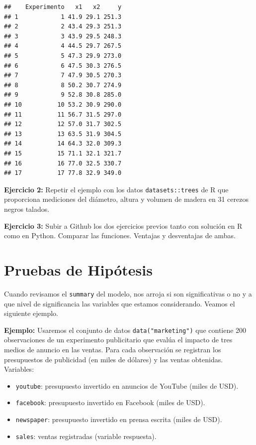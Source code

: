 \documentclass[
]{book}
\providecommand{\tightlist}{%
  \setlength{\itemsep}{0pt}\setlength{\parskip}{0pt}}
\begin{document}
\begin{verbatim}
##    Experimento   x1   x2     y
## 1            1 41.9 29.1 251.3
## 2            2 43.4 29.3 251.3
## 3            3 43.9 29.5 248.3
## 4            4 44.5 29.7 267.5
## 5            5 47.3 29.9 273.0
## 6            6 47.5 30.3 276.5
## 7            7 47.9 30.5 270.3
## 8            8 50.2 30.7 274.9
## 9            9 52.8 30.8 285.0
## 10          10 53.2 30.9 290.0
## 11          11 56.7 31.5 297.0
## 12          12 57.0 31.7 302.5
## 13          13 63.5 31.9 304.5
## 14          14 64.3 32.0 309.3
## 15          15 71.1 32.1 321.7
## 16          16 77.0 32.5 330.7
## 17          17 77.8 32.9 349.0
\end{verbatim}

\textbf{Ejercicio 2:} Repetir el ejemplo con los datos \texttt{datasets::trees} de R que proporciona mediciones
del diámetro, altura y volumen de madera en 31 cerezos negros talados.

\textbf{Ejercicio 3:} Subir a Github los dos ejercicios previos tanto con solución en R como en Python. Comparar las funciones. Ventajas y desventajas de ambas.

\section{Pruebas de Hipótesis}\label{pruebas-de-hipuxf3tesis}

Cuando revisamos el \texttt{summary} del modelo, nos arroja si son significativas o no y a que nivel de significancia las variables que estamos considerando. Veamos el siguiente ejemplo.

\textbf{Ejemplo: } Usaremos el conjunto de datos \texttt{data("marketing")} que contiene 200 observaciones de un experimento publicitario que evalúa el impacto de tres medios de anuncio en las ventas. Para cada observación se registran los presupuestos de publicidad (en miles de dólares) y las ventas obtenidas.
Variables:

\begin{itemize}
\tightlist
\item
  \texttt{youtube}: presupuesto invertido en anuncios de YouTube (miles de USD).
\item
  \texttt{facebook}: presupuesto invertido en Facebook (miles de USD).
\item
  \texttt{newspaper}: presupuesto invertido en prensa escrita (miles de USD).
\item
  \texttt{sales}: ventas registradas (variable respuesta).
\end{itemize}
\end{document}
